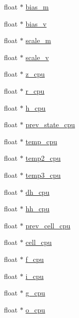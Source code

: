 \begin{DoxyCompactItemize}
float $\ast$ \mbox{\hyperlink{structlayer_acfe31e9816074f6118b1dfaa7c55e53f}{bias\+\_\+m}}
\item 
float $\ast$ \mbox{\hyperlink{structlayer_a52052221eb80a84d1486c79ede9a1477}{bias\+\_\+v}}
\item 
float $\ast$ \mbox{\hyperlink{structlayer_a858dcb301c88b816430a797dce3b95b6}{scale\+\_\+m}}
\item 
float $\ast$ \mbox{\hyperlink{structlayer_a881162ac744dcf116ec9c14c97fb1633}{scale\+\_\+v}}
\item 
float $\ast$ \mbox{\hyperlink{structlayer_aa38a67974b34aad9ada08b970ace3318}{z\+\_\+cpu}}
\item 
float $\ast$ \mbox{\hyperlink{structlayer_aaaefd9c6dccae5505e5600831d99a026}{r\+\_\+cpu}}
\item 
float $\ast$ \mbox{\hyperlink{structlayer_aff93d520e69e75d6aa104a687d5ab21e}{h\+\_\+cpu}}
\item 
float $\ast$ \mbox{\hyperlink{structlayer_afcadbe531d4b320c23877019284168b0}{prev\+\_\+state\+\_\+cpu}}
\item 
float $\ast$ \mbox{\hyperlink{structlayer_a8a566c099cbba1da8bb7cc4d90643d0b}{temp\+\_\+cpu}}
\item 
float $\ast$ \mbox{\hyperlink{structlayer_a12c40b990c72966e93dc2936c5a91447}{temp2\+\_\+cpu}}
\item 
float $\ast$ \mbox{\hyperlink{structlayer_a5576a957c950547134d305cb5e7ed42b}{temp3\+\_\+cpu}}
\item 
float $\ast$ \mbox{\hyperlink{structlayer_acb9dec30688fb0f1d836e14e507a441d}{dh\+\_\+cpu}}
\item 
float $\ast$ \mbox{\hyperlink{structlayer_af62005e5700299a59c76dafe7bb00529}{hh\+\_\+cpu}}
\item 
float $\ast$ \mbox{\hyperlink{structlayer_a4844271cfffe336d89a934705c8e3cc9}{prev\+\_\+cell\+\_\+cpu}}
\item 
float $\ast$ \mbox{\hyperlink{structlayer_a0dbcc8d653aaea58b9aaddcda570b9fb}{cell\+\_\+cpu}}
\item 
float $\ast$ \mbox{\hyperlink{structlayer_a2f326ac879fefe2ab4ef8a4b48664b01}{f\+\_\+cpu}}
\item 
float $\ast$ \mbox{\hyperlink{structlayer_a3cbe33860e4b1605034034f9dbddc227}{i\+\_\+cpu}}
\item 
float $\ast$ \mbox{\hyperlink{structlayer_abc8c1af0663167cc50b83e918e0a3c1d}{g\+\_\+cpu}}
\item 
float $\ast$ \mbox{\hyperlink{structlayer_ae0b82851bad0a9588a448e93bf6ba5cc}{o\+\_\+cpu}}

\end{DoxyCompactItemize}
